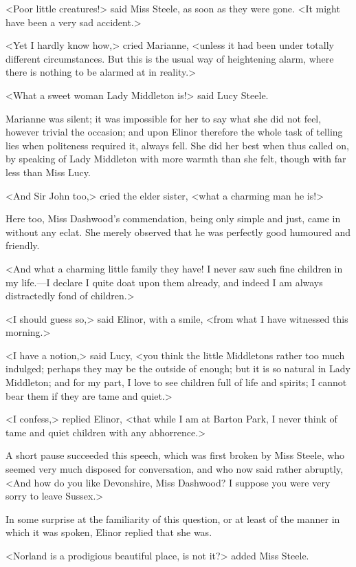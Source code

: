 <Poor little creatures!> said Miss Steele, as soon as they were gone. <It might have been a very sad accident.>

<Yet I hardly know how,> cried Marianne, <unless it had been under totally different circumstances. But this is the usual way of heightening alarm, where there is nothing to be alarmed at in reality.>

<What a sweet woman Lady Middleton is!> said Lucy Steele.

Marianne was silent; it was impossible for her to say what she did not feel, however trivial the occasion; and upon Elinor therefore the whole task of telling lies when politeness required it, always fell. She did her best when thus called on, by speaking of Lady Middleton with more warmth than she felt, though with far less than Miss Lucy.

<And Sir John too,> cried the elder sister, <what a charming man he is!>

Here too, Miss Dashwood's commendation, being only simple and just, came in without any eclat. She merely observed that he was perfectly good humoured and friendly.

<And what a charming little family they have! I never saw such fine children in my life.—I declare I quite doat upon them already, and indeed I am always distractedly fond of children.>

<I should guess so,> said Elinor, with a smile, <from what I have witnessed this morning.>

<I have a notion,> said Lucy, <you think the little Middletons rather too much indulged; perhaps they may be the outside of enough; but it is so natural in Lady Middleton; and for my part, I love to see children full of life and spirits; I cannot bear them if they are tame and quiet.>

<I confess,> replied Elinor, <that while I am at Barton Park, I never think of tame and quiet children with any abhorrence.>

A short pause succeeded this speech, which was first broken by Miss Steele, who seemed very much disposed for conversation, and who now said rather abruptly, <And how do you like Devonshire, Miss Dashwood? I suppose you were very sorry to leave Sussex.>

In some surprise at the familiarity of this question, or at least of the manner in which it was spoken, Elinor replied that she was.

<Norland is a prodigious beautiful place, is not it?> added Miss Steele.

